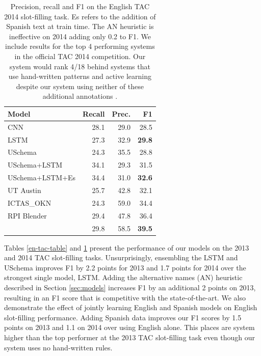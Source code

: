 \begin{table}[t!]
\begin{center}
\begin{tabular}{|lrrr|}
\hline
\bf Model & \bf Recall & \bf Prec. & \bf F1 \\
\hline\hline
CNN                 & 28.1 & 29.0 & 28.5 \\
LSTM                & 27.3 & 32.9 & \bf 29.8  \\
USchema             & 24.3 & 35.5 & 28.8 \\
\hline\hline
USchema+LSTM        & 34.1 & 29.3 & 31.5 \\
USchema+LSTM+Es        & 34.4 & 31.0 & \bf 32.6 \\
\hline\hline
UT Austin & 25.7 & 42.8 & 32.1 \\
ICTAS\_OKN & 24.3 & 59.0 & 34.4 \\
RPI Blender & 29.4 & 47.8 & 36.4 \\
\citet{angeli2014stanford} & 29.8 & 58.5 & \bf 39.5 \\

\hline
\end{tabular}
\caption{Precision, recall and F1 on the English TAC 2014 slot-filling task. Es refers to the addition of Spanish text at train time. The AN heuristic is ineffective on 2014 adding only 0.2 to F1. We include results for the top 4 performing systems in the official TAC 2014 competition. Our system would rank 4/18 behind systems that use hand-written patterns and active learning despite our system using neither of these additional annotations \protect\citep{SurdeanuMihai2014}.\label{2014-en-tac-table}}
\end{center}
\end{table}

Tables \ref{en-tac-table} and \ref{2014-en-tac-table} present the performance of our models on the 2013 and 2014 TAC slot-filling tasks. Unsurprisingly, ensembling the LSTM and USchema improves F1 by 2.2 points for 2013 and 1.7 points for 2014 over the strongest single model, LSTM. Adding the alternative names (AN) heuristic described in Section \ref{sec:models} increases F1 by an additional 2 points on 2013, resulting in an F1 score that is competitive with the state-of-the-art. We also demonstrate the effect of jointly learning English and Spanish models on English slot-filling performance. Adding Spanish data improves our F1 scores by 1.5 points on 2013 and 1.1 on 2014 over using English alone. This places are system higher than the top performer at the 2013 TAC slot-filling task even though our system uses no hand-written rules.


